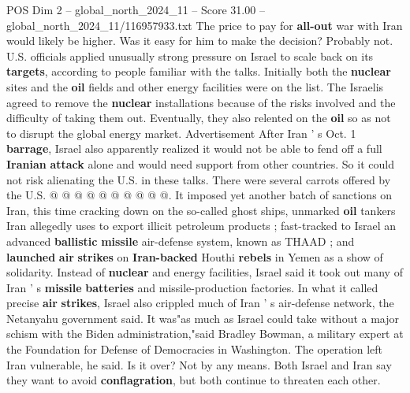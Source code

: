 \begin{textsample}{POS Dim 2 – global\_north\_2024\_11 – Score 31.00 – global\_north\_2024\_11/116957933.txt}
The price to pay for \textbf{all-out} war with Iran would likely be higher.
Was it easy for him to make the decision?
Probably not.
U.S. officials applied unusually strong pressure on Israel to scale back on its \textbf{targets}, according to people familiar with the talks.
Initially both the \textbf{nuclear} sites and the \textbf{oil} fields and other energy facilities were on the list.
The Israelis agreed to remove the \textbf{nuclear} installations because of the risks involved and the difficulty of taking them out.
Eventually, they also relented on the \textbf{oil} so as not to disrupt the global energy market.
Advertisement After Iran ' s Oct. 1 \textbf{barrage}, Israel also apparently realized it would not be able to fend off a full \textbf{Iranian} \textbf{attack} alone and would need support from other countries.
So it could not risk alienating the U.S. in these talks.
There were several carrots offered by the U.S. @ @ @ @ @ @ @ @ @ @.
It imposed yet another batch of sanctions on Iran, this time cracking down on the so-called ghost ships, unmarked \textbf{oil} tankers Iran allegedly uses to export illicit petroleum products ; fast-tracked to Israel an advanced \textbf{ballistic} \textbf{missile} air-defense system, known as THAAD ; and \textbf{launched} \textbf{air} \textbf{strikes} on \textbf{Iran-backed} Houthi \textbf{rebels} in Yemen as a show of solidarity.
Instead of \textbf{nuclear} and energy facilities, Israel said it took out many of Iran ' s \textbf{missile} \textbf{batteries} and missile-production factories.
In what it called precise \textbf{air} \textbf{strikes}, Israel also crippled much of Iran ' s air-defense network, the Netanyahu government said.
It was"as much as Israel could take without a major schism with the Biden administration,"said Bradley Bowman, a military expert at the Foundation for Defense of Democracies in Washington.
The operation left Iran vulnerable, he said.
Is it over?
Not by any means.
Both Israel and Iran say they want to avoid \textbf{conflagration}, but both continue to threaten each other.

\end{textsample}
